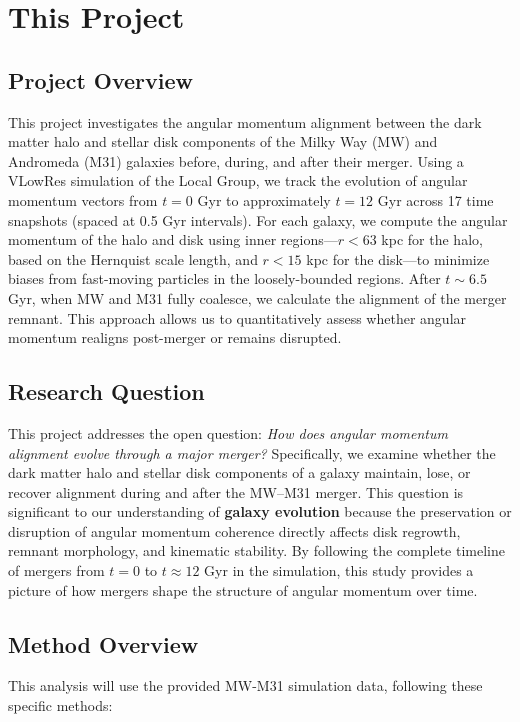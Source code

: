 \documentclass[twocolumn]{aastex631}
\begin{document}
\section{This Project}

\subsection{Project Overview}

This project investigates the angular momentum alignment between the dark matter halo and stellar disk components of the Milky Way (MW) and Andromeda (M31) galaxies before, during, and after their merger. Using a VLowRes simulation of the Local Group, we track the evolution of angular momentum vectors from $t = 0$ Gyr to approximately $t = 12$ Gyr across 17 time snapshots (spaced at 0.5 Gyr intervals). For each galaxy, we compute the angular momentum of the halo and disk using inner regions—$r < 63$ kpc for the halo, based on the Hernquist scale length, and $r < 15$ kpc for the disk—to minimize biases from fast-moving particles in the loosely-bounded regions. After $t \sim 6.5$ Gyr, when MW and M31 fully coalesce, we calculate the alignment of the merger remnant. This approach allows us to quantitatively assess whether angular momentum realigns post-merger or remains disrupted.

\subsection{Research Question}

This project addresses the open question: \textit{How does angular momentum alignment evolve through a major merger?} Specifically, we examine whether the dark matter halo and stellar disk components of a galaxy maintain, lose, or recover alignment during and after the MW–M31 merger. This question is significant to our understanding of \textbf{galaxy evolution} because the preservation or disruption of angular momentum coherence directly affects disk regrowth, remnant morphology, and kinematic stability. By following the complete timeline of mergers from $t = 0$ to $t \approx 12$ Gyr in the simulation, this study provides a picture of how mergers shape the structure of angular momentum over time. 

\subsection{Method Overview}
This analysis will use the provided MW-M31 simulation data, following these specific methods:
\end{document}

